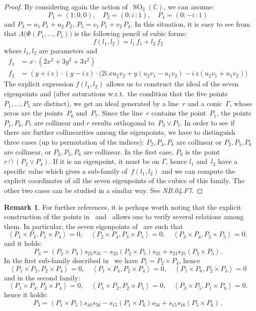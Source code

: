 \documentclass[a4paper, 11pt, reqno]{amsart}
\theoremstyle{plain}
\theoremstyle{definition}
\newtheorem{rmk}[lemma]{Remark}
\newcommand{\C}{\mathbb{C}}
\newcommand{\nb}[2]{\textsl{{NB}.{#1}.{#2}}}
\newcommand{\iii}{\textit{i}\,}
\newcommand{\SO}{\operatorname{SO}}
\newcommand{\scl}[2]{\left\langle {#1}, {#2} \right\rangle}
\begin{document}
\begin{proof}
By considering again the action of~$\SO_3(\C)$, we can assume:
%
\[
  P_1 = (1: 0: 0), \quad
  P_2 = (0: \iii: 1), \quad
  P_4 = (0: -\iii: 1)
\]
%
and $P_3 = u_1 \, P_1 + u_2 \, P_2$, $P_5 = v_1 \, P_1 + v_2 \, P_4$. 
In this situation, it
is easy to see from  that $\Lambda\bigl(\Phi(P_1, \dots, P_5)\bigr)$
is the following pencil of cubic forms:
%
\[
  f(l_1, l_2) = l_1 \, f_1 + l_2 \, f_2
\]
%
where $l_1, l_2$ are parameters and
%
\begin{align*}
 f_1 & = x \cdot \left(2x^{2} + 3 y^{2} + 3 z^{2}\right)\\
  f_2 & = (y + \iii z) \cdot (y - \iii z)
  \cdot \bigl(2 \iii x u_{2} v_{2} + y (u_{2} v_{1}- u_{1} v_{2})
  - \iii z (u_{2} v_{1} + u_{1} v_{2})\bigr)
\end{align*}
%
The explicit expression $f(l_1, l_2)$ allows us to
construct the ideal of the seven eigenpoints and (after
saturations w.r.t.\ the condition that the five points $P_1, \dotsc, P_5$ are distinct),
we get an ideal generated by a line~$r$ and a conic~$\Gamma$, whose zeros are
the points~$P_6$ and~$P_7$. Since the line~$r$ contains the point~$P_1$,
the points $P_1, P_6, P_7$ are collinear and $r$ results orthogonal to~$P_3 \vee P_5$.
In order to see if there are further collinearities among the
eigenpoints, we have to distinguish three cases (up to permutation
of the indices): $P_2, P_4, P_6$ are collinear or $P_2, P_5, P_6$ are
collinear, or $P_3, P_5, P_6$ are collinear. In the first case, $P_6$
is the point $r \cap (P_2\vee P_4)$. If it is an eigenpoint, it must be
on $\Gamma$, hence $l_1$ and~$l_2$ have a specific value which gives a sub-family
of~$f(l_1, l_2)$ and we can compute the explicit coordinates of
all the seven eigenpoints of the cubics of this family. The other two
cases can be studied in a similar way. See \nb{04}{F7}.
\end{proof}
\begin{rmk}
\label{rmk:three_orthog} For further references, it is perhaps worth noting that the explicit 
construction of the 
points in~ and~ allows one to verify
several relations among them. In particular, the seven eigenpoints
of~ are such that
\[
\scl{P_1\times P_2}{P_1 \times P_4}=0, \quad 
\scl{P_2\times P_4}{P_3 \times P_5}=0, \quad 
\scl{P_3\times P_4}{P_2 \times P_5}=0;
\]
and it holds:
\[
P_4 = (P_2\times P_3)s_{25}s_{35}-s_{23}(P_2\times P_5)s_{35}+ s_{23}s_{25}(P_3\times P_5).
\]
In the first sub-family described in~ we have 
$P_1 = P_2 \times P_4$, hence 
\[
\scl{P_1\times P_2}{P_2 \times P_4}=0, \quad 
\scl{P_1\times P_4}{P_2 \times P_4}=0, \quad 
\scl{P_1\times P_6}{P_2 \times P_4}=0
\]
and in the second family:
\[
\scl{P_1\times P_4}{P_3 \times P_4}=0, \quad 
\scl{P_1\times P_2}{P_2 \times P_5}=0, \quad 
\scl{P_3\times P_5}{P_1 \times P_6}=0.
\]
hence it holds:
\[
P_3 = (P_1 \times P_5)s_{16}s_{56}-s_{15}(P_1\times P_6)s_{56}+s_{15}s_{16}(P_5 \times P_6) \,.
\]
\end{rmk}
%
\end{document}
